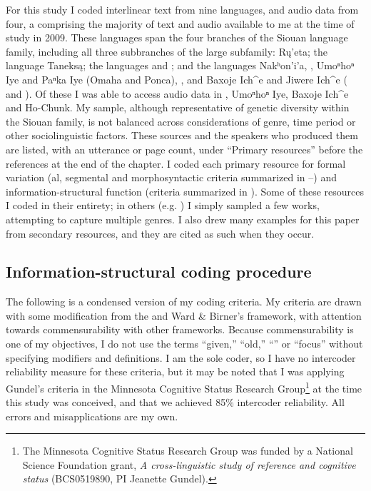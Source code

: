 \documentclass[output=paper]{LSP/langsci}
\begin{document}
For this study I coded interlinear text from nine languages, and audio data from four, a  comprising the majority of text and audio available to me at the time of study in 2009. These languages span the four branches of the Siouan language family, including all three subbranches of the large  subfamily: Rų’eta; the  language Taneksą; the  languages  and ; and the  languages Nakʰon’i’a, , Umoⁿhoⁿ Iye and Paⁿka Iye (Omaha and Ponca), , and Baxoje Ich\^{}e  and Jiwere Ich\^{}e  ( and ). Of these I was able to access audio data in , Umoⁿhoⁿ Iye, Baxoje Ich\^{}e and Ho-Chunk. My sample, although representative of genetic diversity within the Siouan family, is not balanced across considerations of genre, time period or other sociolinguistic factors. These sources and the speakers who produced them are listed, with an utterance or page count, under “Primary resources” before the references at the end of the chapter. I coded each primary resource for formal variation (al, segmental and morphosyntactic criteria summarized in --) and information-structural function (criteria summarized in ). Some of these resources I coded in their entirety; in others (e.g. \citealt{Dorsey1890}) I simply sampled a few works, attempting to capture multiple genres. I also drew many examples for this paper from secondary resources, and they are cited as such when they occur. 

\subsection{Information-structural coding procedure}\label{informationcoding}

The following is a condensed version of my coding criteria. My criteria are drawn with some modification from the  \citep{Gundeletal1993} and Ward \& Birner’s \citeyearpar{WardBirner2001} framework, with attention towards commensurability with other frameworks. Because commensurability is one of my objectives, I do not use the terms ``given,'' ``old,'' ``'' or ``focus'' without specifying modifiers and definitions. I am the sole coder, so I have no intercoder reliability measure for these criteria, but it may be noted that I was applying Gundel’s criteria in the Minnesota Cognitive Status Research Group\footnote{The Minnesota Cognitive Status Research Group was funded by a National Science Foundation grant, \textit{A cross-linguistic study of reference and cognitive status} (BCS0519890, PI Jeanette Gundel).} at the time this study was conceived, and that we achieved 85\% intercoder reliability. All errors and misapplications are my own.
\end{document}
